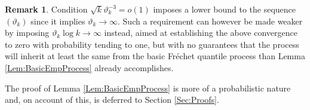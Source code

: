 \documentclass[11pt, a4paper, oneside]{article}
\numberwithin{equation}{section}
\theoremstyle{plain}
\theoremstyle{definition}
\newtheorem{rem}{Remark}
\begin{document}
\begin{rem}
	Condition $\sqrt{k}\vartheta_k^{-3}=o(1)$ imposes a lower bound to the sequence $(\vartheta_k)$ since it implies $\vartheta_k \rightarrow \infty$. Such a requirement can however be made weaker by imposing $\vartheta_k \log k \rightarrow \infty$ instead, aimed at establishing the above convergence to zero with probability tending to one, but with no guarantees that the process will inherit at least the same from the basic Fr\'echet quantile process than Lemma \ref{Lem:BasicEmpProcess} already accomplishes. %
\end{rem}
The proof of Lemma \ref{Lem:BasicEmpProcess} is more of a probabilistic nature and, on account of this, is deferred to Section \ref{Sec:Proofs}.\\
\end{document}
